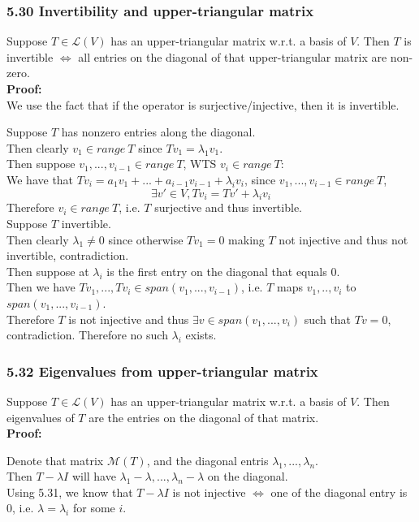 \documentclass{article}
\begin{document}
\subsubsection*{5.30 Invertibility and upper-triangular matrix}
Suppose $T \in \mathcal{L}(V)$ has an upper-triangular matrix w.r.t. a basis of $V$. Then $T$ is invertible $\iff$ all entries on the diagonal of that upper-triangular matrix are non-zero.\\
\textbf{\Large Proof:}\\
We use the fact that if the operator is surjective/injective, then it is invertible.
\begin{addmargin}[1em]{0em}
    Suppose $T$ has nonzero entries along the diagonal.\\
    Then clearly $v_1 \in range\ T$ since $Tv_1 = \lambda_1v_1$.\\
    Then suppose $v_1, ..., v_{i-1} \in range\ T$, WTS $v_i \in range\ T$:\\
    We have that $Tv_i = a_1v_1 + ... + a_{i-1}v_{i-1} + \lambda_i v_i$, since $v_1, ..., v_{i-1} \in range\ T$,
    \begin{equation*}
        \exists v' \in V, Tv_i = Tv' + \lambda_i v_i
    \end{equation*}
    Therefore $v_i \in range\ T$, i.e. $T$ surjective and thus invertible.\\
    Suppose $T$ invertible.\\
    Then clearly $\lambda_1 \neq 0$ since otherwise $Tv_1 = 0$ making $T$ not injective and thus not invertible, contradiction.\\
    Then suppose at $\lambda_i$ is the first entry on the diagonal that equals $0$.\\
    Then we have $Tv_1, ..., Tv_i \in span(v_1, ..., v_{i-1})$, i.e. $T$ maps $v_1, .., v_i$ to $span(v_1, ..., v_{i-1})$.\\
    Therefore $T$ is not injective and thus $\exists v \in span(v_1, ..., v_i)$ such that $Tv = 0$, contradiction. Therefore no such $\lambda_i$ exists.
\end{addmargin}
\subsubsection*{5.32 Eigenvalues from upper-triangular matrix}
Suppose $T \in \mathcal{L}(V)$ has an upper-triangular matrix w.r.t. a basis of $V$. Then eigenvalues of $T$ are the entries on the diagonal of that matrix.\\
\textbf{\large Proof:\\}
\begin{addmargin}[1em]{0em}
    Denote that matrix $\mathcal{M}(T)$, and the diagonal entris $\lambda_1, ..., \lambda_n$.\\
    Then $T - \lambda I$ will have $\lambda_1 - \lambda, ..., \lambda_n - \lambda$ on the diagonal.\\
    Using 5.31, we know that $T - \lambda I$ is not injective $\iff $ one of the diagonal entry is $0$, i.e. $\lambda = \lambda_i$ for some $i$.
\end{addmargin}
\end{document}

